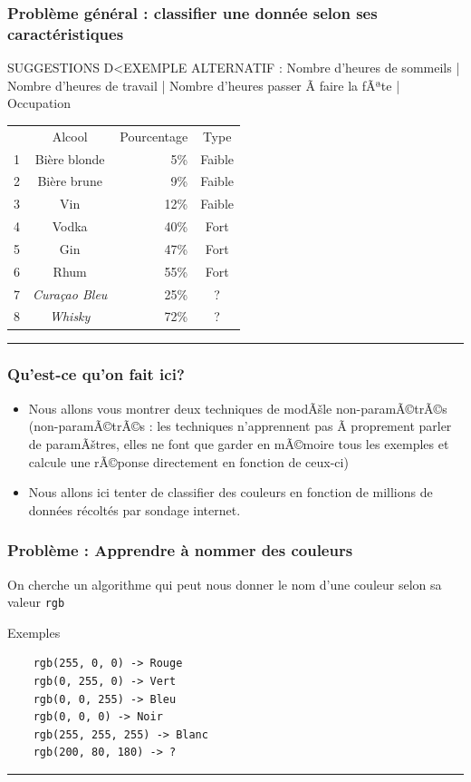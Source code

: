 \documentclass[french]{beamer}
\begin{document}
\begin{frame}[fragile]
\frametitle{Problème général : classifier une donnée selon ses
caractéristiques}

SUGGESTIONS D<EXEMPLE ALTERNATIF : Nombre d'heures de sommeils | Nombre d'heures de travail | Nombre d'heures passer Ã  faire la fÃªte | Occupation 

\begin{center}
\begin{tabular}{rcrc}
& Alcool & Pourcentage & Type\\
1 & Bière blonde & 5\% & Faible
\\
2 & Bière brune & 9\% & Faible
\\
3 & Vin & 12\% & Faible
\\
4 & Vodka & 40\% & Fort
\\
5 & Gin & 47\% & Fort
\\
6 & Rhum & 55\% & Fort
\\
7 & \emph{Curaçao Bleu} & 25\% & ?
\\
8 & \emph{Whisky} & 72\% & ?
\\
\end{tabular}
\end{center}

\begin{center}\rule{3in}{0.4pt}\end{center}
\end{frame}

\begin{frame}
\frametitle{Qu'est-ce qu'on fait ici?}

\begin{itemize}
\item Nous allons vous montrer deux techniques de modÃšle non-paramÃ©trÃ©s (non-paramÃ©trÃ©s : les techniques n'apprennent pas Ã  proprement parler de paramÃštres, elles ne font que garder en mÃ©moire tous les exemples et calcule une rÃ©ponse directement en fonction de ceux-ci)
\item Nous allons ici tenter de classifier des couleurs en fonction de millions de données récoltés par sondage internet. 
\end{itemize}

\end{frame}


\begin{frame}[fragile]
\frametitle{Problème : Apprendre à nommer des
couleurs}

On cherche un algorithme qui peut nous donner le nom d'une couleur selon
sa valeur \texttt{rgb}

{Exemples}

\begin{verbatim}
    rgb(255, 0, 0) -> Rouge
    rgb(0, 255, 0) -> Vert
    rgb(0, 0, 255) -> Bleu
    rgb(0, 0, 0) -> Noir
    rgb(255, 255, 255) -> Blanc
    rgb(200, 80, 180) -> ?
\end{verbatim}

\begin{center}\rule{3in}{0.4pt}\end{center}
\end{frame}
\end{document}
